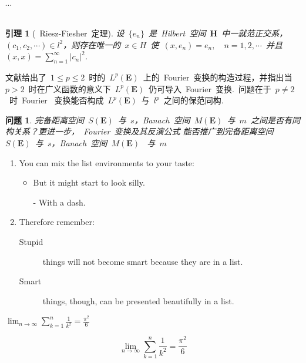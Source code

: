 \documentclass[a4paper,11pt]{article}
\newcommand{\xiaosi}{\fontsize{12pt}{18pt}\selectfont}      %
\newtheorem{property}{问题}
\newtheorem{lemma}{引理}
\begin{document}
{{{$\cdots$
{\subsection{\textbf{\song\xiaosi{函数空间与数列空间的联系}}}}

\begin{lemma}[~Riesz-Fiesher~定理]                %
设~$\{e_n\}$~是~Hilbert~空间~$\mathbf{H}$~中一就范正交系，$(c_1,c_2,\cdots)\in l^2$，则存在唯一的~$x\in H$~使~$(x,e_n)=e_n,\quad n=1,2,\cdots$~并且~$(x,x)=\sum\limits_{n=1}^\infty|c_n|^2$.\\
\end{lemma}


文献\cite{cankao4}给出了~$1\leq p\leq 2$~时的~$L^p(\mathbf{E})$~上的~Fourier~变换的构造过程，并指出当
~$p>2$~时在广义函数的意义下~$L^p(\mathbf{E})$~仍可导入~Fourier~变换.\ 问题在于~$p\neq 2$~时~Fourier
~变换能否构成~$L^p(\mathbf{E})$~与~$l^p$~之间的保范同构.


\begin{property}\label{pro2}                  %
完备距离空间~$S(\mathbf{E})$~与~$s$，Banach~空间~$M(\mathbf{E})$~与~$m$~之间是否有同构关系？更进一步，~Fourier~变换及其反演公式
能否推广到完备距离空间~$S(\mathbf{E})$~与~$s$，Banach~空间~$M(\mathbf{E})$~ 与~$m$
\end{property}
}}}
\song 
\flushleft
\begin{enumerate}
\item You can mix the list
environments to your taste:
\begin{itemize}
\item But it might start to
look silly.
\item[-] With a dash.
\end{itemize}
\item Therefore remember:
\begin{description}
\item[Stupid] things will not
become smart because they are
in a list.
\item[Smart] things, though, can be
presented beautifully in a list.
\end{description}
\end{enumerate}

$\lim_{n \to \infty}
\sum_{k=1}^n \frac{1}{k^2}
= \frac{\pi^2}{6}$

\begin{displaymath}
\lim_{n \to \infty}
\sum_{k=1}^n \frac{1}{k^2}
= \frac{\pi^2}{6}
\end{displaymath}
\end{document}
